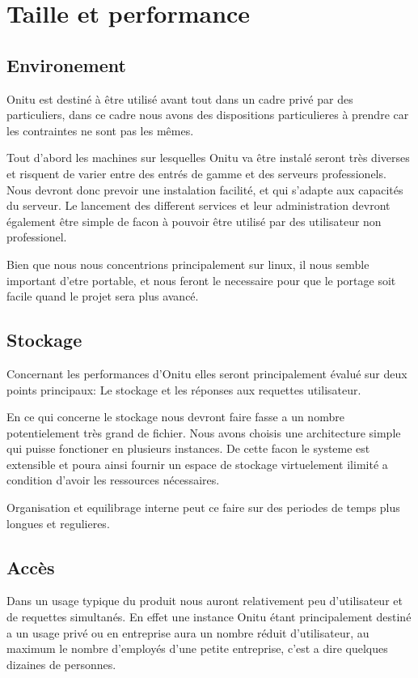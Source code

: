 \chapter{Taille et performance}
\thispagestyle{EIP} %

\section{Environement}

Onitu est destiné à être utilisé avant tout dans un cadre privé par des particuliers, dans ce cadre nous avons des dispositions particulieres à prendre car les contraintes ne sont pas les mêmes.

Tout d'abord les machines sur lesquelles Onitu va être instalé seront très diverses et risquent de varier entre des entrés de gamme et des serveurs professionels. Nous devront donc prevoir une instalation facilité, et qui s'adapte aux capacités du serveur. Le lancement des different services et leur administration devront également être simple de facon à pouvoir être utilisé par des utilisateur non professionel.

Bien que nous nous concentrions principalement sur linux, il nous semble important d'etre portable, et nous feront le necessaire pour que le portage soit facile quand le projet sera plus avancé.

\section{Stockage}

Concernant les performances d'Onitu elles seront principalement évalué sur deux points principaux: Le stockage et les réponses aux requettes utilisateur.

En ce qui concerne le stockage nous devront faire fasse a un nombre potentielement très grand de fichier. Nous avons choisis une architecture simple qui puisse fonctioner en plusieurs instances. De cette facon le systeme est extensible et poura ainsi fournir un espace de stockage virtuelement ilimité a condition d'avoir les ressources nécessaires.

Organisation et equilibrage interne peut ce faire sur des periodes de temps plus longues et regulieres.

\section{Accès}

Dans un usage typique du produit nous auront relativement peu d'utilisateur et de requettes simultanés. En effet une instance Onitu étant principalement destiné a un usage privé ou en entreprise aura un nombre réduit d'utilisateur, au maximum le nombre d'employés d'une petite entreprise, c'est a dire quelques dizaines de personnes.

